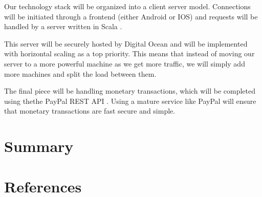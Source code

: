\documentclass[11pt]{article}
\begin{document}
Our technology stack will be organized into a client server model. 
Connections will be initiated through a frontend (either Android or IOS) and requests will be handled by a server written in Scala \cite{scala}. 

This server will be securely hosted by Digital Ocean and will be implemented with horizontal scaling as a top priority. This means that instead of moving our server to a more powerful machine as we get more traffic, we will simply add more machines and split the load between them.

The final piece will be handling monetary transactions, which will be completed using thethe PayPal REST API \cite{paypal}. Using a mature service like PayPal will ensure that monetary transactions are fast secure and simple.

%
\section{Summary}


    
 
    \section{References} 
    
    

    
    
    \pagebreak
%  


%
%
%
\end{document}
